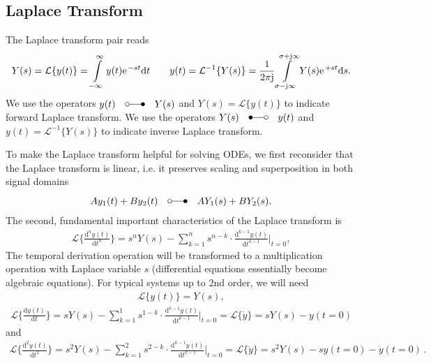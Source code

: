 \documentclass[a4paper,11pt,oneside]{scrartcl}
\begin{document}
\subsection{Laplace Transform}
The Laplace transform pair reads
\begin{align}
Y(s) = \mathcal{L}\{y(t)\}= \int\limits_{-\infty}^{\infty} y(t) \e^{-s t}
\mathrm{d} t\qquad
y(t) = \mathcal{L}^{-1}\{Y(s)\}= \frac{1}{2\pi\im}\int
\limits_{\sigma-\im \infty}^{\sigma+\im\infty} Y(s) \e^{+s t} \mathrm{d} s.
\end{align}
We use the operators
$y(t) \quad \laplace \quad Y(s)$ and
$Y(s) = \mathcal{L}\{y(t)\}$
to indicate forward Laplace transform.
We use the operators
$Y(s) \quad \Laplace \quad y(t)$ and
$y(t) = \mathcal{L}^{-1}\{Y(s)\}$
to indicate inverse Laplace transform.

To make the Laplace transform helpful for solving ODEs, we first reconsider
that the Laplace transform is linear, i.e. it preserves scaling and
superposition in both signal domains
\begin{align}
A y_1(t) + B y_2(t) \quad \laplace \quad A Y_1(s) + B Y_2(s).
\end{align}
The second, fundamental important characteristics of the Laplace transform is
\begin{align}
\mathcal{L}\{\frac{\mathrm{d}^n y(t)}{\mathrm{d} t^n}\}=
s^n Y(s) - \sum_{k=1}^{n} s^{n-k} \cdot
\frac{\mathrm{d}^{k-1} y(t)}{\mathrm{d} t^{k-1}}\bigg|_{t=0},
\end{align}
The temporal derivation operation will be transformed to a multiplication
operation with Laplace variable $s$ (differential equations essentially become
algebraic equations).
%
For typical systems up to 2nd order, we will need
\begin{align}
\label{eq:Laplace0thd}
\boxed{\mathcal{L}\{{y(t)}\} = Y(s)},
\end{align}
\begin{align}
\label{eq:Laplace1std}
\mathcal{L}\{\frac{\mathrm{d} y(t)}{\mathrm{d} t}\}=
s Y(s) - \sum_{k=1}^{1} s^{1-k} \cdot
\frac{\mathrm{d}^{k-1} y(t)}{\mathrm{d} t^{k-1}}\bigg|_{t=0}
= \boxed{\mathcal{L}\{\dot{y}\} = s Y(s) - y(t=0)}
\end{align}
and
\begin{align}
\label{eq:Laplace2ndd}
\mathcal{L}\{\frac{\mathrm{d}^2 y(t)}{\mathrm{d} t^2}\}=
s^2 Y(s) - \sum_{k=1}^{2} s^{2-k} \cdot
\frac{\mathrm{d}^{k-1} y(t)}{\mathrm{d} t^{k-1}}\bigg|_{t=0}
= \boxed{\mathcal{L}\{\ddot{y}\} = s^2 Y(s) - s y(t=0) - \dot{y}(t=0)}\,.
\end{align}
\end{document}
